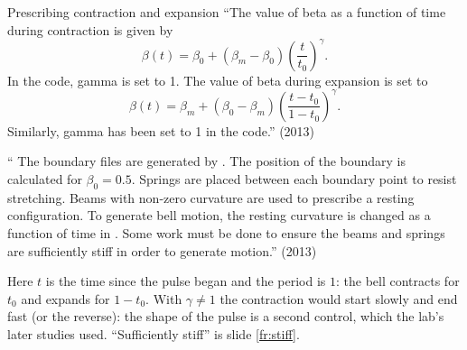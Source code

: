 \documentclass[aspectratio=169,11pt]{beamer}
\begin{document}
\begin{frame}{Prescribing contraction and expansion}
\label{fr:jelly2}
\footnotesize ``The value of beta as a function of time during contraction is given by
\[
  \beta(t) = \beta_0 + (\beta_m - \beta_0)\left(\frac{t}{t_0}\right)^{\gamma} .
\]
In the code, gamma is set to 1. The value of beta during expansion is set to
\[
  \beta(t) = \beta_m + (\beta_0 - \beta_m)\left(\frac{t - t_0}{1 - t_0}\right)^{\gamma} .
\]
Similarly, gamma has been set to 1 in the code.'' (2013)
\vspace{1mm}

\footnotesize `` The boundary files are generated by . The position of the boundary is calculated for $\beta_0 = 0.5$. Springs are placed between each boundary point to resist stretching. Beams with non-zero curvature are used to prescribe a resting configuration. To generate bell motion, the resting curvature is changed as a function of time in . Some work must be done to ensure the beams and springs are sufficiently stiff in order to generate motion.'' (2013)
\vspace{1mm}
\begin{punchbox}
\footnotesize Here $t$ is the time since the pulse began and the period is $1$: the bell contracts for $t_0$ and expands for $1 - t_0$. With $\gamma \neq 1$ the contraction would start slowly and end fast (or the reverse): the shape of the pulse is a second control, which the lab's later studies used. ``Sufficiently stiff'' is slide \ref{fr:stiff}.
\end{punchbox}
\end{frame}
\end{document}
